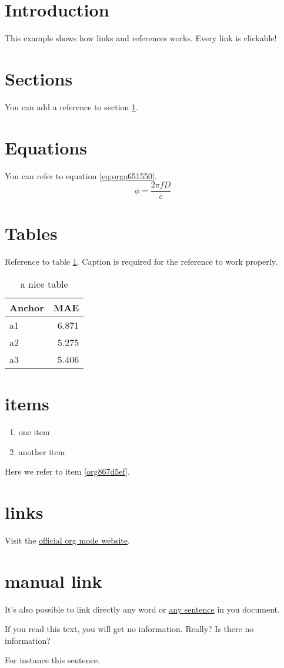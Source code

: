 


\section{Introduction}
\label{sec:orge14cd9e}
This example shows how links and references works.
Every link is clickable!

\section{Sections}
\label{sec:org809de3e}
You can add a reference to section \ref{sec:orge14cd9e}.

\section{Equations}
\label{sec:orga2a91b5}
You can refer to equation \ref{eq:orga651550}.
\begin{equation}
\label{eq:orga651550}
\phi = \frac{2\pi fD}{c}
\end{equation}

\section{Tables}
\label{sec:org7055d1a}
Reference to table \ref{tab:org2bb5b48}.
Caption is required for the reference to work properly.

\begin{table}[htbp]
\caption{\label{tab:org2bb5b48}
a nice table}
\centering
\begin{tabular}{lr}
Anchor & MAE\\
\hline
a1 & 6.871\\
a2 & 5.275\\
a3 & 5.406\\
\end{tabular}
\end{table}

\section{items}
\label{sec:org8ee493e}
\begin{enumerate}
\item one item
\item \label{org867d5ef}another item
\end{enumerate}
Here we refer to item \ref{org867d5ef}.

\section{links}
\label{sec:org0c0963d}
Visit the \href{https://orgmode.org/}{official org mode website}.

\section{manual link}
\label{sec:orge651c58}
It's also possible to link directly any word
or \hyperlink{thesentence}{any sentence} in you document.

If you read this text, you will get no information.  Really?
Is there no information?

For instance \hypertarget{thesentence}{this sentence}.


